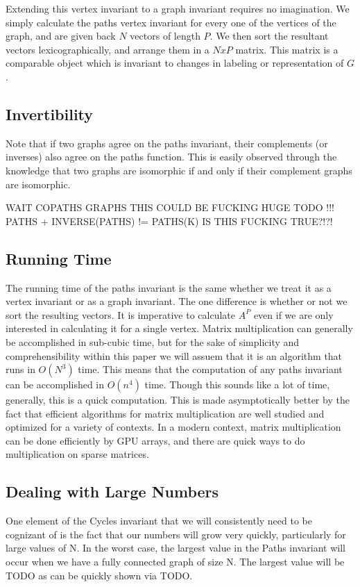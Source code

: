 \documentclass[11pt,a4paper]{report}
\begin{document}
Extending this vertex invariant to a graph invariant requires no imagination. 
We simply calculate the paths vertex invariant for every one of the vertices of the graph, and are given back $N$ vectors of length $P$.
We then sort the resultant vectors lexicographically, and arrange them in a $NxP$ matrix.
This matrix is a comparable object which is invariant to changes in labeling or representation of $G$.

\subsection{Invertibility}
Note that if two graphs agree on the paths invariant, their complements (or inverses) also agree on the paths function.
This is easily observed through the knowledge that two graphs are isomorphic if and only if their complement graphs are isomorphic.

WAIT COPATHS GRAPHS THIS COULD BE FUCKING HUGE
TODO !!! PATHS + INVERSE(PATHS) != PATHS(K)
IS THIS FUCKING TRUE?!?!

\subsection{Running Time}
The running time of the paths invariant is the same whether we treat it as a vertex invariant or as a graph invariant.
The one difference is whether or not we sort the resulting vectors.
It is imperative to calculate $A^P$ even if we are only interested in calculating it for a single vertex.
Matrix multiplication can generally be accomplished in sub-cubic time, but for the sake of simplicity and comprehensibility within this paper we will assuem that it is an algorithm that runs in $O(N^3)$  time.
This means that the computation of any paths invariant can be accomplished in $O(n^4)$ time.
Though this sounds like a lot of time, generally, this is a quick computation.
This is made asymptotically better by the fact that efficient algorithms for matrix multiplication are well studied and optimized for a variety of contexts.
In a modern context, matrix multiplication can be done efficiently by GPU arrays, and there are quick ways to do multiplication on sparse matrices.

\subsection{Dealing with Large Numbers}
One element of the Cycles invariant that we will consistently need to be cognizant of is the fact that our numbers will grow very quickly, particularly for large values of N.
In the worst case, the largest value in the Paths invariant will occur when we have a fully connected graph of size N.
The largest value will be TODO as can be quickly shown via TODO.
\end{document}
